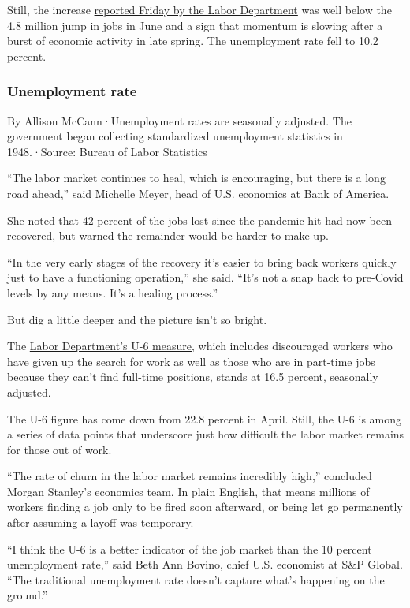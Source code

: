 Still, the increase
\href{https://www.bls.gov/news.release/empsit.nr0.htm}{reported Friday
by the Labor Department} was well below the 4.8 million jump in jobs in
June and a sign that momentum is slowing after a burst of economic
activity in late spring. The unemployment rate fell to 10.2 percent.

\hypertarget{unemployment-rate}{%
\subsubsection{Unemployment rate}\label{unemployment-rate}}

By Allison McCann·Unemployment rates are seasonally adjusted. The
government began collecting standardized unemployment statistics in
1948.·Source: Bureau of Labor Statistics

``The labor market continues to heal, which is encouraging, but there is
a long road ahead,'' said Michelle Meyer, head of U.S. economics at Bank
of America.

She noted that 42 percent of the jobs lost since the pandemic hit had
now been recovered, but warned the remainder would be harder to make up.

``In the very early stages of the recovery it's easier to bring back
workers quickly just to have a functioning operation,'' she said. ``It's
not a snap back to pre-Covid levels by any means. It's a healing
process.''

But dig a little deeper and the picture isn't so bright.

The \href{https://www.bls.gov/news.release/empsit.t15.htm}{Labor
Department's U-6 measure}, which includes discouraged workers who have
given up the search for work as well as those who are in part-time jobs
because they can't find full-time positions, stands at 16.5 percent,
seasonally adjusted.

The U-6 figure has come down from 22.8 percent in April. Still, the U-6
is among a series of data points that underscore just how difficult the
labor market remains for those out of work.

``The rate of churn in the labor market remains incredibly high,''
concluded Morgan Stanley's economics team. In plain English, that means
millions of workers finding a job only to be fired soon afterward, or
being let go permanently after assuming a layoff was temporary.

``I think the U-6 is a better indicator of the job market than the 10
percent unemployment rate,'' said Beth Ann Bovino, chief U.S. economist
at S\&P Global. ``The traditional unemployment rate doesn't capture
what's happening on the ground.''

